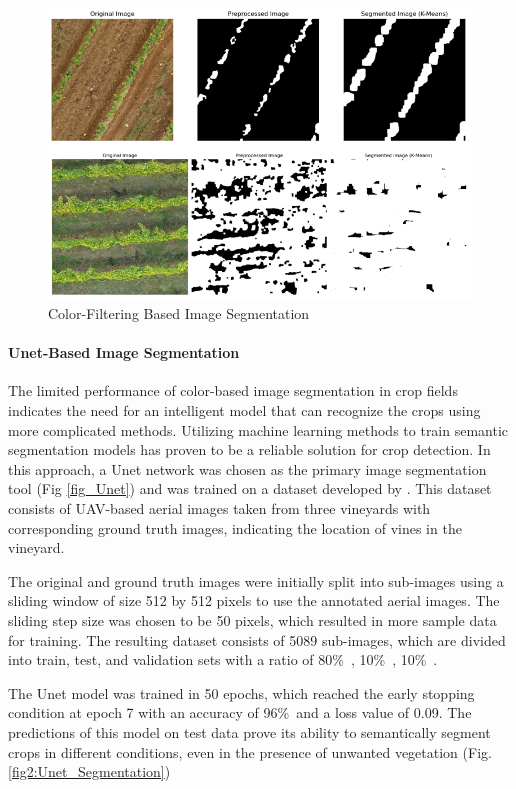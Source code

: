 \documentclass[conference]{IEEEtran}
\begin{document}
\begin{figure}[htbp]
\centering
\includegraphics[width=\linewidth]{kmeans_predictions.png}
\caption{Color-Filtering Based Image Segmentation
\cite{b5}}
\label{fig2:kmeans}
\end{figure}


\paragraph{Unet-Based Image Segmentation}
The limited performance of color-based image segmentation in crop fields indicates the need for an intelligent model that can recognize the crops using more complicated methods. Utilizing machine learning methods to train semantic segmentation models has proven to be a reliable solution for crop detection. In this approach, a Unet network was chosen as the primary image segmentation tool (Fig
\ref{fig_Unet})
and was trained on a dataset developed by
\cite{b5}
. This dataset consists of UAV-based aerial images taken from three vineyards with corresponding ground truth images, indicating the location of vines in the vineyard.

The original and ground truth images were initially split into sub-images using a sliding window of size 512 by 512 pixels to use the annotated aerial images. The sliding step size was chosen to be 50 pixels, which resulted in more sample data for training. The resulting dataset consists of 5089 sub-images, which are divided into train, test, and validation sets with a ratio of 80\%\
, 10\%\
, 10\%\
.

The Unet model was trained in 50 epochs, which reached the early stopping condition at epoch 7 with an accuracy of 96\%\ and a loss value of 0.09. The predictions of this model on test data prove its ability to semantically segment crops in different conditions, even in the presence of unwanted vegetation (Fig. 
\ref{fig2:Unet_Segmentation})
\end{document}
